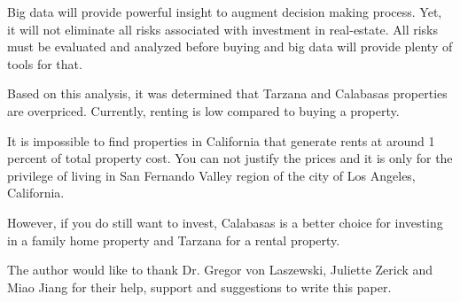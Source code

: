 \documentclass[sigconf]{acmart}
\begin{document}
Big data will provide powerful insight to augment decision making process. Yet, it will not eliminate all risks associated with investment in real-estate. All risks must be evaluated and analyzed before buying and big data will provide plenty of tools for that.

Based on this analysis, it was determined that Tarzana and Calabasas properties are overpriced. Currently, renting is low compared to buying a property.

It is impossible to find properties in California that generate rents at around 1 percent of total property cost. You can not justify the prices and it is only for the privilege of living in San Fernando Valley region of the city of Los Angeles, California.

However, if you do still want to invest, Calabasas is a better choice for investing in a family home property and Tarzana for a rental property.

\begin{acks}

  The author would like to thank Dr. Gregor von Laszewski, Juliette Zerick and Miao Jiang for their help, support and suggestions to write this paper.

\end{acks}


 
\end{document}
